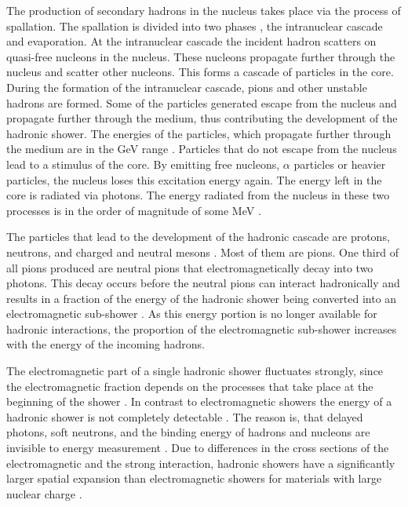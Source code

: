 \documentclass[12pt, a4paper]{thesis}
\begin{document}
The production of secondary hadrons in the nucleus takes place via the
process of spallation. The spallation is divided into two phases
\cite{wigman18}, the intranuclear cascade and evaporation.  At the
intranuclear cascade the incident hadron scatters on quasi-free
nucleons in the nucleus. These nucleons propagate further through the
nucleus and scatter other nucleons. This forms a cascade of particles
in the core. During the formation of the intranuclear cascade, pions
and other unstable hadrons are formed. Some of the particles generated
escape from the nucleus and propagate further through the medium, thus
contributing the development of the hadronic shower. The energies of
the particles, which propagate further through the medium are in the
GeV range \cite{fabjan03}. Particles that do not escape from the
nucleus lead to a stimulus of the core. By emitting free nucleons,
$\alpha$ particles or heavier particles, the nucleus loses this
excitation energy again. The energy left in the core is radiated via
photons. The energy radiated from the nucleus in these two processes
is in the order of magnitude of some MeV \cite{fabjan03}.

The particles that lead to the development of the hadronic cascade are
protons, neutrons, and charged and neutral mesons
\cite{fabjan03}. Most of them are pions. One third of all pions
produced are neutral pions that electromagnetically decay into two
photons. This decay occurs before the neutral pions can interact
hadronically and results in a fraction of the energy of the hadronic
shower being converted into an electromagnetic sub-shower
\cite{fabjan03}. As this energy portion is no longer available for
hadronic interactions, the proportion of the electromagnetic
sub-shower increases with the energy of the incoming hadrons.

The electromagnetic part of a single hadronic shower fluctuates
strongly, since the electromagnetic fraction depends on the processes
that take place at the beginning of the shower \cite{wigman18}. In
contrast to electromagnetic showers the energy of a hadronic shower is
not completely detectable \cite{wigman18}. The reason is, that delayed
photons, soft neutrons, and the binding energy of hadrons and nucleons
are invisible to energy measurement \cite{fabjan03}. Due to
differences in the cross sections of the electromagnetic and the
strong interaction, hadronic showers have a significantly larger
spatial expansion than electromagnetic showers for materials with
large nuclear charge \cite{wigman18}.
\end{document}
